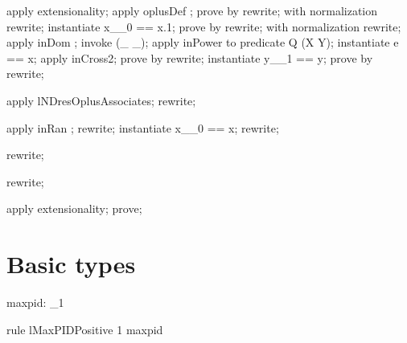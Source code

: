 \begin{LPScript}\begin{forget}[lNDresOplusAssociates]
apply  extensionality;
apply  oplusDef ;
prove by rewrite;
with normalization rewrite;
instantiate  x\_\_0 == x.1;
prove by rewrite;
with normalization rewrite;
apply  inDom ;
invoke (\_ \rel  \_);
apply inPower to predicate Q \in  \power  (X \cross  Y);
instantiate  e == x;
apply  inCross2;
prove by rewrite;
instantiate  y\_\_1 == y;
prove by rewrite;
\end{forget}\end{LPScript}

\begin{LPScript}\begin{forget}[lNDresUnitOplusUnitAssociates]
apply  lNDresOplusAssociates;
rewrite;
\end{forget}\end{LPScript}

\begin{LPScript}\begin{forget}[lInRanNDresUnit]
apply  inRan ;
rewrite;
instantiate  x\_\_0 == x;
rewrite;
\end{forget}\end{LPScript}

\begin{LPScript}\begin{forget}[lNDresNDresBackwards]
rewrite;
\end{forget}\end{LPScript}

\begin{LPScript}\begin{forget}[lNRresNRresBackwards]
rewrite;
\end{forget}\end{LPScript}

\begin{LPScript}\begin{forget}[lDResNDresTradingSetminus]
    apply extensionality;
    prove;
\end{forget}\end{LPScript}\section{Basic types}\label{basic-datatype}

\begin{axdef}
  maxpid: \nat_1
\end{axdef}

\begin{theorem}{rule lMaxPIDPositive}
  1 \leq  maxpid
\end{theorem}

